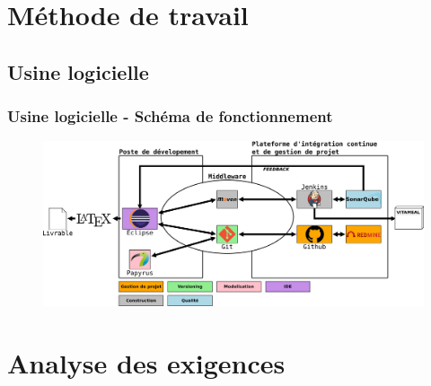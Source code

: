 \documentclass{beamer}
\begin{document}
\section{Méthode de travail}

\subsection{Usine logicielle}
\begin{frame}[label=schemaFonctionnement]
  \frametitle{Usine logicielle - Schéma de fonctionnement}
\begin{figure}[H]
\label{schema}
  \centering
      \includegraphics[width=1.0\textwidth]{usine_vitameal.png} %
\end{figure}
\end{frame}

\section{Analyse des exigences}
\end{document}
